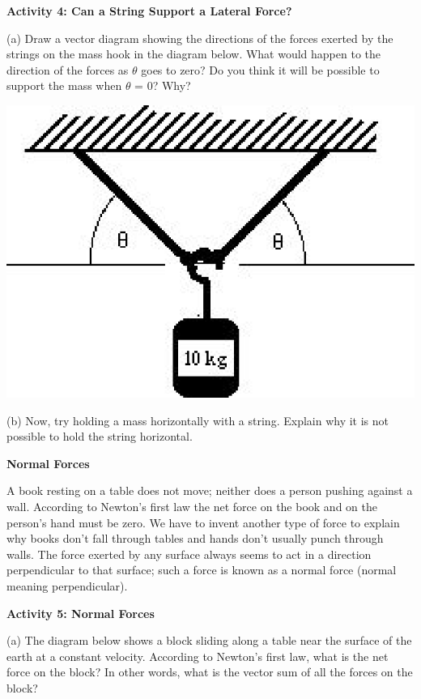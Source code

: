 \textbf{Activity 4: Can a String Support a Lateral Force?} 

(a) Draw a vector diagram showing the directions of the forces exerted by the
strings on the mass hook in the diagram below. What would happen to the direction
of the forces as \( \theta  \) goes to zero? Do you think it will be possible
to support the mass when \( \theta  \) = 0? Why?

\vspace{0.3cm}
{\par\raggedright \includegraphics{newton/newton_fig8.eps} \par}
\vspace{0.3cm}

(b) Now, try holding a mass horizontally with a string. Explain why it is not possible to hold the string horizontal.
\vspace{20mm}

\textbf{Normal Forces} 

A book resting on a table does not move; neither does a person pushing against
a wall. According to Newton's first law the net force on the book and on the
person's hand must be zero. We have to invent another type of force
to explain why books don't fall through tables and hands don't usually punch
through walls. The force exerted by any surface always seems to act in a direction perpendicular to that surface; such a force is known as a normal force (normal meaning perpendicular).

\textbf{Activity 5: Normal Forces }

(a) The diagram below shows a block sliding along a table near the surface of
the earth at a constant velocity. According to Newton's first law, what is the
net force on the block? In other words, what is the vector sum of all the forces on the block?

